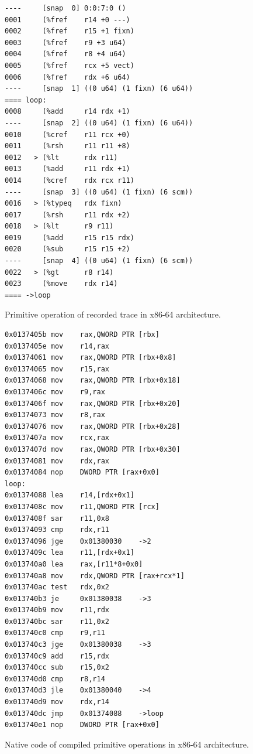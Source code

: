\documentclass[preprint]{sigplanconf}
\begin{document}
\begin{figure}
\begin{verbatim}
----     [snap  0] 0:0:7:0 ()
0001     (%fref    r14 +0 ---)
0002     (%fref    r15 +1 fixn)
0003     (%fref    r9 +3 u64)
0004     (%fref    r8 +4 u64)
0005     (%fref    rcx +5 vect)
0006     (%fref    rdx +6 u64)
----     [snap  1] ((0 u64) (1 fixn) (6 u64))
==== loop:
0008     (%add     r14 rdx +1)
----     [snap  2] ((0 u64) (1 fixn) (6 u64))
0010     (%cref    r11 rcx +0)
0011     (%rsh     r11 r11 +8)
0012   > (%lt      rdx r11)
0013     (%add     r11 rdx +1)
0014     (%cref    rdx rcx r11)
----     [snap  3] ((0 u64) (1 fixn) (6 scm))
0016   > (%typeq   rdx fixn)
0017     (%rsh     r11 rdx +2)
0018   > (%lt      r9 r11)
0019     (%add     r15 r15 rdx)
0020     (%sub     r15 r15 +2)
----     [snap  4] ((0 u64) (1 fixn) (6 scm))
0022   > (%gt      r8 r14)
0023     (%move    rdx r14)
==== ->loop
\end{verbatim}
\caption{Primitive operation of recorded trace in x86-64 architecture.}
\label{fig:primops}
\end{figure}

\begin{figure}
  \centering
\begin{verbatim}
0x0137405b mov    rax,QWORD PTR [rbx]
0x0137405e mov    r14,rax
0x01374061 mov    rax,QWORD PTR [rbx+0x8]
0x01374065 mov    r15,rax
0x01374068 mov    rax,QWORD PTR [rbx+0x18]
0x0137406c mov    r9,rax
0x0137406f mov    rax,QWORD PTR [rbx+0x20]
0x01374073 mov    r8,rax
0x01374076 mov    rax,QWORD PTR [rbx+0x28]
0x0137407a mov    rcx,rax
0x0137407d mov    rax,QWORD PTR [rbx+0x30]
0x01374081 mov    rdx,rax
0x01374084 nop    DWORD PTR [rax+0x0]
loop:
0x01374088 lea    r14,[rdx+0x1]
0x0137408c mov    r11,QWORD PTR [rcx]
0x0137408f sar    r11,0x8
0x01374093 cmp    rdx,r11
0x01374096 jge    0x01380030    ->2
0x0137409c lea    r11,[rdx+0x1]
0x013740a0 lea    rax,[r11*8+0x0]
0x013740a8 mov    rdx,QWORD PTR [rax+rcx*1]
0x013740ac test   rdx,0x2
0x013740b3 je     0x01380038    ->3
0x013740b9 mov    r11,rdx
0x013740bc sar    r11,0x2
0x013740c0 cmp    r9,r11
0x013740c3 jge    0x01380038    ->3
0x013740c9 add    r15,rdx
0x013740cc sub    r15,0x2
0x013740d0 cmp    r8,r14
0x013740d3 jle    0x01380040    ->4
0x013740d9 mov    rdx,r14
0x013740dc jmp    0x01374088    ->loop
0x013740e1 nop    DWORD PTR [rax+0x0]
\end{verbatim}
\caption{Native code of compiled primitive operations in x86-64 architecture.}
\label{fig:ncode}
\end{figure}
\end{document}
